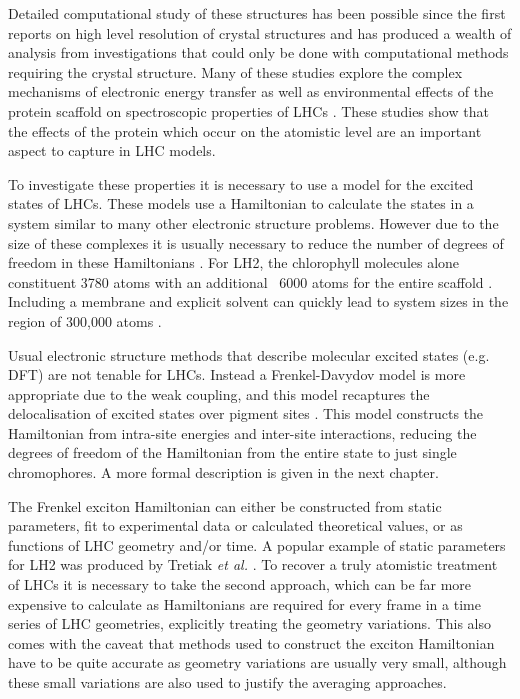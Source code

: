 Detailed computational study of these structures has been possible since the first
reports on high level resolution of crystal structures \cite{Mcdermott1995, Koepke1996} 
and has produced a wealth of analysis from investigations that could only be done 
with computational methods requiring the crystal structure. Many of these studies 
explore the complex mechanisms of electronic energy transfer as well as environmental 
effects of the protein scaffold on spectroscopic properties of LHCs \cite{SlaMa2020, Jang2015, Curutchet2016, Mirkovic2016}. 
These studies show that the effects of the protein which occur on the atomistic
level are an important aspect to capture in LHC models.

To investigate these properties it is necessary to use a model for the excited states
of LHCs. These models use a Hamiltonian to calculate the states in a system similar to 
many other electronic structure problems. However due to the size of these complexes
it is usually necessary to reduce the number of degrees of freedom in these Hamiltonians
\cite{Mallus2018, SlaMa2020}. For LH2, the chlorophyll molecules alone constituent
3780 atoms with an additional ~6000 atoms for the entire scaffold \cite{Neugebauer2008, Cherezov2006}.
Including a membrane and explicit solvent can quickly lead to system sizes in the 
region of 300,000 atoms \cite{Mennucci2019}.

Usual electronic structure methods that describe molecular excited states (e.g. 
DFT) are not tenable for LHCs. Instead a Frenkel-Davydov model is more appropriate
due to the weak coupling, and this model recaptures the delocalisation of excited
states over pigment sites \cite{Frenkel1931, Davydov1964}. This model constructs
the Hamiltonian from intra-site energies and inter-site interactions, reducing the
degrees of freedom of the Hamiltonian from the entire state to just single chromophores.
A more formal description is given in the next chapter.

The Frenkel exciton Hamiltonian can either be constructed from static parameters,
fit to experimental data or calculated theoretical values, or as functions of LHC 
geometry and/or time. A popular example of static parameters for LH2 was produced
by Tretiak \emph{et al.} \cite{Tretiak2000}. To recover a truly atomistic treatment
of LHCs it is necessary to take the second approach, which can be far more expensive 
to calculate as Hamiltonians are required for every frame in a time series of LHC 
geometries, explicitly treating the geometry variations. This also comes with the 
caveat that methods used to construct the exciton Hamiltonian have to be quite accurate 
as geometry variations are usually very small, although these small variations are
also used to justify the averaging approaches.

